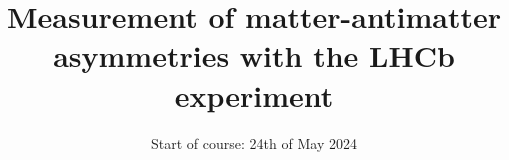 

\title{Measurement of matter-antimatter asymmetries with the LHCb experiment}
\date{%
  Start of course: 24th of May 2024
}



\maketitle
\thispagestyle{empty}
\tableofcontents
\newpage






\printbibliography{}

\appendix
\newpage
%


